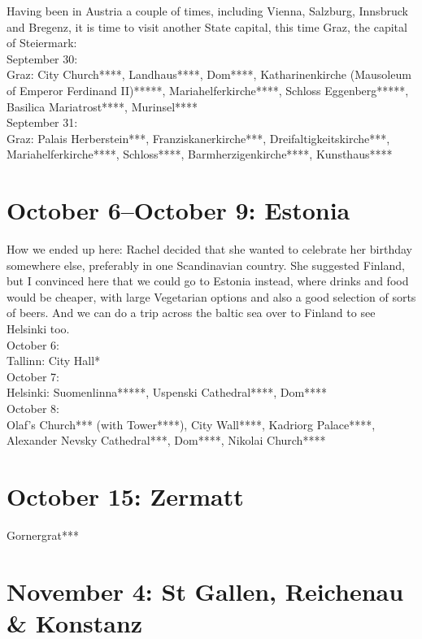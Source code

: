 Having been in Austria a couple of times, including Vienna, Salzburg, Innsbruck and Bregenz, it is time to visit another State capital, this time Graz, the capital of Steiermark:\\

September 30:\\
Graz: City Church****, Landhaus****, Dom****, Katharinenkirche (Mausoleum of Emperor Ferdinand II)*****, Mariahelferkirche****, Schloss Eggenberg*****, Basilica Mariatrost****, Murinsel****\\

September 31:\\
Graz: Palais Herberstein***, Franziskanerkirche***, Dreifaltigkeitskirche***, Mariahelferkirche****, Schloss****, Barmherzigenkirche****, Kunsthaus****

\section{October 6--October 9: Estonia}
\label{Estonia2017}

How we ended up here: Rachel decided that she wanted to celebrate her birthday somewhere else, preferably in one Scandinavian country. She suggested Finland, but I convinced here that we could go to Estonia instead, where drinks and food would be cheaper, with large Vegetarian options and also a good selection of sorts of beers. And we can do a trip across the baltic sea over to Finland to see Helsinki too.\\

October 6:\\
Tallinn: City Hall*\\

October 7:\\
Helsinki: Suomenlinna*****, Uspenski Cathedral****, Dom****\\

October 8:\\
Olaf's Church*** (with Tower****), City Wall****, Kadriorg Palace****, Alexander Nevsky Cathedral***, Dom****, Nikolai Church****

\section{October 15: Zermatt}
\label{Zermatt2017}

Gornergrat***

\section{November 4: St Gallen, Reichenau \& Konstanz}
\label{StGallen2017}

